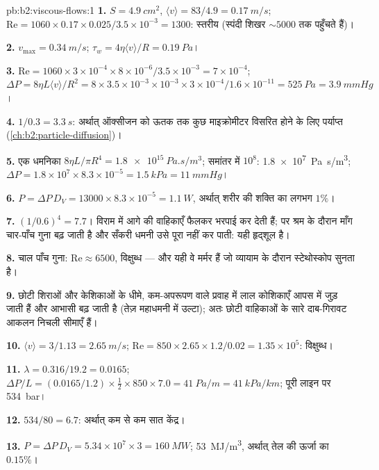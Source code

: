 \begin{solution}{pb:b2:viscous-flows:1}
\textbf{1.} $S = \qty{4.9}{cm^2}$, $\langle v\rangle = 83/4.9 = \qty{0.17}{m/s}$; $\mathrm{Re}
= 1060 \times 0.17 \times 0.025/3.5 \times 10^{-3} = 1300$: स्तरीय (स्पंदी शिखर
$\sim 5000$ तक पहुँचते हैं)।

\textbf{2.} $v_{\max} = \qty{0.34}{m/s}$; $\tau_w = 4\eta\langle v\rangle/R = \qty{0.19}{Pa}$।

\textbf{3.} $\mathrm{Re} = 1060 \times 3 \times 10^{-4} \times 8 \times 10^{-6}/3.5 \times 10^{-3} =
7 \times 10^{-4}$; $\Delta P = 8\eta L\langle v\rangle/R^2 = 8 \times 3.5 \times 10^{-3} \times 10^{-3}
\times 3 \times 10^{-4}/1.6 \times 10^{-11} = \qty{525}{Pa} = \qty{3.9}{mmHg}$।

\textbf{4.} $1/0.3 = \qty{3.3}{s}$: अर्थात् ऑक्सीजन को ऊतक तक कुछ माइक्रोमीटर
विसरित होने के लिए पर्याप्त (\cref{ch:b2:particle-diffusion})।

\textbf{5.} एक धमनिका $8\eta L/\pi R^4 = \qty{1.8e15}{Pa.s/m^3}$; समांतर में
$10^8$: \qty{1.8e7}{Pa.s/m^3}; $\Delta P = 1.8 \times 10^7 \times 8.3 \times 10^{-5} =
\qty{1.5}{kPa} = \qty{11}{mmHg}$।

\textbf{6.} $P = \Delta P\,D_V = 13000 \times 8.3 \times 10^{-5} = \qty{1.1}{W}$, अर्थात्
शरीर की शक्ति का लगभग $1\%$।

\textbf{7.} $(1/0.6)^4 = 7.7$। विराम में आगे की वाहिकाएँ फैलकर भरपाई कर
देती हैं; पर श्रम के दौरान माँग चार-पाँच गुना बढ़ जाती है और
सँकरी धमनी उसे पूरा नहीं कर पाती: यही हृद्शूल है।

\textbf{8.} चाल पाँच गुना: $\mathrm{Re} \approx 6500$, विक्षुब्ध --- और यही
वे मर्मर हैं जो व्यायाम के दौरान स्टेथोस्कोप सुनता है।

\textbf{9.} छोटी शिराओं और केशिकाओं के धीमे, कम-अपरूपण वाले प्रवाह में
लाल कोशिकाएँ आपस में जुड़ जाती हैं और आभासी  बढ़ जाती है (तेज़
महाधमनी में उल्टा); अतः छोटी वाहिकाओं के सारे दाब-गिरावट आकलन
निचली सीमाएँ हैं।

\textbf{10.} $\langle v\rangle = 3/1.13 = \qty{2.65}{m/s}$; $\mathrm{Re} = 850 \times 2.65 \times
1.2/0.02 = 1.35 \times 10^5$: विक्षुब्ध।

\textbf{11.} $\lambda = 0.316/19.2 = 0.0165$; $\Delta P/L = (0.0165/1.2) \times \tfrac12 \times
850 \times 7.0 = \qty{41}{Pa/m} = \qty{41}{kPa/km}$; पूरी लाइन पर \qty{534}{bar}।

\textbf{12.} $534/80 = 6.7$: अर्थात् कम से कम सात केंद्र।

\textbf{13.} $P = \Delta P\,D_V = 5.34 \times 10^7 \times 3 = \qty{160}{MW}$;
\qty{53}{MJ/m^3}, अर्थात् तेल की ऊर्जा का $0.15\%$।


\end{solution}
